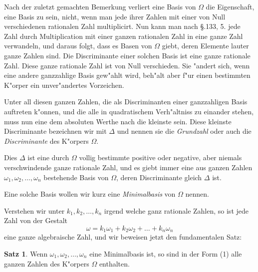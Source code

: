 \documentclass[12pt,a4paper]{article}
\theoremstyle{definition}
\newtheorem*{satz}{Satz}
\begin{document}
Nach der zuletzt gemachten Bemerkung verliert eine Basis von $\Omega$ die Eigenschaft, eine Basis zu sein, nicht, wenn man jede ihrer Zahlen mit einer von Null verschiedenen rationalen Zahl multiplicirt. Nun kann man nach \S.133, 5. jede Zahl durch Multiplication mit einer ganzen rationalen Zahl in eine ganze Zahl verwandeln, und daraus folgt, dass es Basen von $\Omega$ giebt, deren Elemente lauter ganze Zahlen sind. Die Discriminante einer solchen Basis ist eine ganze rationale Zahl. Diese ganze rationale Zahl ist von Null verschieden. Sie "andert sich, wenn eine andere ganzzahlige Basis gew"ahlt wird, beh"alt aber f"ur einen bestimmten K"orper ein unver"andertes Vorzeichen.

Unter all diesen ganzen Zahlen, die als Discriminanten einer ganzzahligen Basis auftreten k"onnen, und die alle in quadratischem Verh"altniss zu einander stehen, muss nun eine dem absoluten Werthe nach die kleinste sein. Diese kleinste Discriminante bezeichnen wir mit $\Delta$ und nennen sie die \emph{Grundzahl} oder auch die \emph{Discriminante} des K"orpers $\Omega$.

Dies $\Delta$ ist eine durch $\Omega$ vollig bestimmte positive oder negative, aber niemals verschwindende ganze rationale Zahl, und es giebt immer eine aus ganzen Zahlen $\omega_1, \omega_2, \dots, \omega_n$ bestehende Basis von $\Omega$, deren Discriminante gleich $\Delta$ ist.

Eine solche Basis wollen wir kurz eine \emph{Minimalbasis} von $\Omega$ nennen.

Verstehen wir unter $k_1, k_2, \dots, k_n$ irgend welche ganz rationale Zahlen, so ist jede Zahl von der Gestalt
\begin{equation}
\omega = k_1\omega_1 + k_2\omega_2 + \dots + k_n\omega_n
\end{equation}
eine ganze algebraische Zahl, und wir beweisen jetzt den fundamentalen Satz:

\begin{satz}
Wenn $\omega_1, \omega_2, \dots, \omega_n$ eine Minimalbasis ist, so sind in der Form (1) alle ganzen Zahlen des K"orpers $\Omega$ enthalten.
\end{satz}
\end{document}
